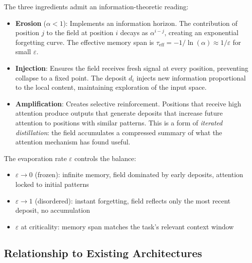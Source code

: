 \documentclass[11pt,a4paper]{article}
\newcommand{\evap}{\varepsilon}
\newcommand{\retain}{\alpha}
\begin{document}
The three ingredients admit an information-theoretic reading:

\begin{itemize}
    \item \textbf{Erosion} ($\retain < 1$): Implements an information
          horizon. The contribution of position $j$ to the field at
          position $i$ decays as $\retain^{i-j}$, creating an
          exponential forgetting curve. The effective memory span is
          $\tau_{\text{eff}} = -1/\!\ln(\retain) \approx 1/\evap$
          for small $\evap$.

    \item \textbf{Injection}: Ensures the field receives fresh signal
          at every position, preventing collapse to a fixed point.
          The deposit $d_i$ injects new information proportional to the
          local content, maintaining exploration of the input space.

    \item \textbf{Amplification}: Creates selective reinforcement.
          Positions that receive high attention produce outputs that
          generate deposits that increase future attention to
          positions with similar patterns. This is a form of
          \emph{iterated distillation}: the field accumulates a
          compressed summary of what the attention mechanism has found
          useful.
\end{itemize}

The evaporation rate $\evap$ controls the balance:
\begin{itemize}
    \item $\evap \to 0$ (frozen): infinite memory, field dominated by
          early deposits, attention locked to initial patterns
    \item $\evap \to 1$ (disordered): instant forgetting, field
          reflects only the most recent deposit, no accumulation
    \item $\evap$ at criticality: memory span matches the task's
          relevant context window
\end{itemize}


\subsection{Relationship to Existing Architectures}
\end{document}
